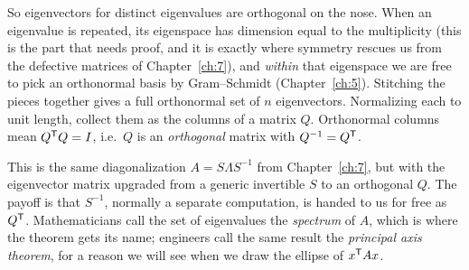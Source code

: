 

So eigenvectors for distinct eigenvalues are orthogonal on the nose. When an eigenvalue is repeated, its eigenspace has dimension equal to the multiplicity (this is the part that needs proof, and it is exactly where symmetry rescues us from the defective matrices of Chapter~\ref{ch:7}), and \emph{within} that eigenspace we are free to pick an orthonormal basis by Gram--Schmidt (Chapter~\ref{ch:5}). Stitching the pieces together gives a full orthonormal set of $n$ eigenvectors. Normalizing each to unit length, collect them as the columns of a matrix $Q$. Orthonormal columns mean $Q^{\mathsf T} Q=I$, i.e.\ $Q$ is an \emph{orthogonal} matrix with $Q^{-1}=Q^{\mathsf T}$.



This is the same diagonalization $A=S\Lambda S^{-1}$ from Chapter~\ref{ch:7}, but with the eigenvector matrix upgraded from a generic invertible $S$ to an orthogonal $Q$. The payoff is that $S^{-1}$, normally a separate computation, is handed to us for free as $Q^{\mathsf T}$. Mathematicians call the set of eigenvalues the \emph{spectrum} of $A$, which is where the theorem gets its name; engineers call the same result the \emph{principal axis theorem}, for a reason we will see when we draw the ellipse of $x^{\mathsf T} Ax$.

